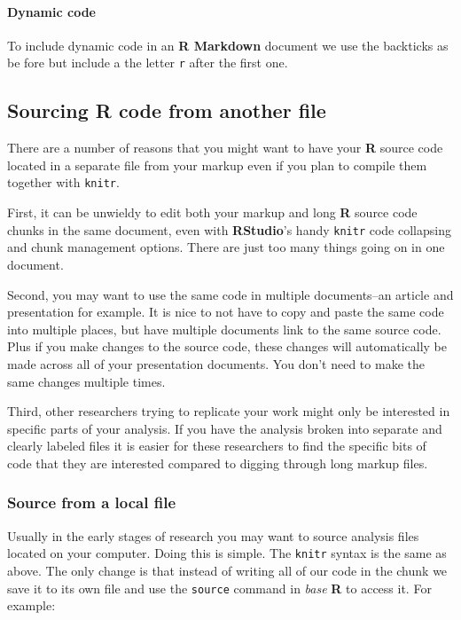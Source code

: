 \documentclass[ChapterTOCs,krantz1]{krantz}\usepackage{graphicx, color}
\begin{document}
\paragraph{Dynamic code}

To include dynamic code in an \textbf{R Markdown} document we use the
backticks as be fore but include a the letter \texttt{r} after the first
one.

\subsection{Sourcing R code from another file}

There are a number of reasons that you might want to have your
\textbf{R} source code located in a separate file from your markup even
if you plan to compile them together with \texttt{knitr}.

First, it can be unwieldy to edit both your markup and long \textbf{R}
source code chunks in the same document, even with \textbf{RStudio}'s
handy \texttt{knitr} code collapsing and chunk management options. There
are just too many things going on in one document.

Second, you may want to use the same code in multiple documents--an
article and presentation for example. It is nice to not have to copy and
paste the same code into multiple places, but have multiple documents
link to the same source code. Plus if you make changes to the source
code, these changes will automatically be made across all of your
presentation documents. You don't need to make the same changes multiple
times.

Third, other researchers trying to replicate your work might only be
interested in specific parts of your analysis. If you have the analysis
broken into separate and clearly labeled files it is easier for these
researchers to find the specific bits of code that they are interested
compared to digging through long markup files.

\subsubsection{Source from a local file}

Usually in the early stages of research you may want to source analysis
files located on your computer. Doing this is simple. The \texttt{knitr}
syntax is the same as above. The only change is that instead of writing
all of our code in the chunk we save it to its own file and use the
\texttt{source} command in \emph{base} \textbf{R} to access it. For
example:
\end{document}
